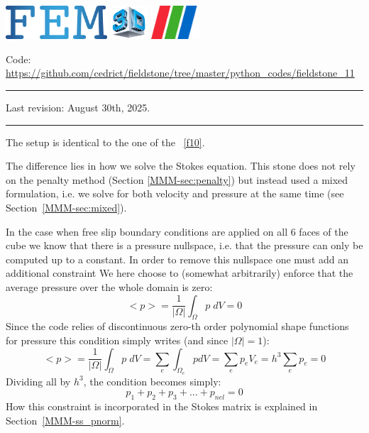 \includegraphics[height=1.25cm]{images/pictograms/FEM}
\includegraphics[height=1.25cm]{images/pictograms/3d}
\includegraphics[height=1.25cm]{images/pictograms/paraview}


%

\begin{center}
\inpython
{\small Code: \url{https://github.com/cedrict/fieldstone/tree/master/python_codes/fieldstone_11}}
\end{center}

\par\noindent\rule{\textwidth}{0.4pt}

Last revision: August 30th, 2025.

\par\noindent\rule{\textwidth}{0.4pt}


The setup is identical to the one of the \stone~\ref{f10}.

The difference lies in how we solve the Stokes equation. This stone does not rely on 
the penalty method (Section \ref{MMM-sec:penalty}) 
but instead used a mixed formulation, i.e. we solve for both 
velocity and pressure at the same time (see Section~\ref{MMM-sec:mixed}).

In the case when free slip boundary conditions are applied on all 
6 faces of the cube we know that there is a pressure nullspace, i.e.
that the pressure can only be computed up to a constant. In order to 
remove this nullspace one must add an additional constraint 
We here choose to (somewhat arbitrarily) enforce that the average pressure 
over the whole domain is zero:
\[
<p>=\frac{1}{|\Omega|} \int_\Omega p \; dV =0 
\]
Since the code relies of discontinuous zero-th order polynomial shape functions 
for pressure this condition simply writes (and since $|\Omega|=1$):
\[
<p>=\frac{1}{|\Omega|} \int_\Omega p\;  dV 
=  \sum_{e} \int_{\Omega_e} p dV = \sum_e p_e V_e = h^3 \sum_e p_e =0
\]
Dividing all by $h^3$, the condition becomes simply:
\[
p_1 + p_2 + p_3 + ... + p_{nel} = 0
\]
How this constraint is incorporated in the Stokes matrix is explained in Section~\ref{MMM-ss_pnorm}.

